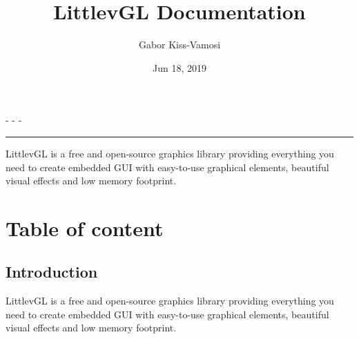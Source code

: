 \documentclass[letterpaper,10pt,english]{sphinxmanual}
\title{LittlevGL Documentation}
\date{Jun 18, 2019}
\author{Gabor Kiss-Vamosi}
\begin{document}
\pagestyle{empty}
\sphinxmaketitle
\pagestyle{plain}
\sphinxtableofcontents
\pagestyle{normal}
\label{\detokenize{index::doc}}
 -
 -
 -


\bigskip\hrule\bigskip





LittlevGL is a free and open-source graphics library providing everything you need to create embedded GUI with easy-to-use graphical elements, beautiful visual effects and low memory footprint.


\chapter{Table of content}
\label{\detokenize{index:table-of-content}}

\section{Introduction}
\label{\detokenize{intro:introduction}}\label{\detokenize{intro::doc}}
LittlevGL is a free and open-source graphics library providing everything you need to create embedded GUI with easy-to-use graphical elements, beautiful visual effects and low memory footprint.
\end{document}

